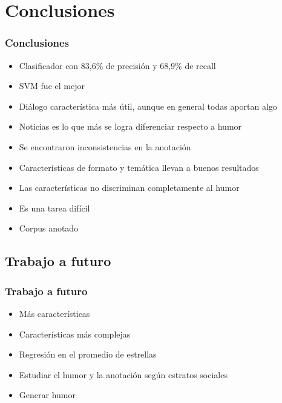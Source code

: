 \section{Conclusiones}

\begin{frame}
    \frametitle{Conclusiones}
    
    \begin{itemize}
        \item[\checkmark] Clasificador con 83,6\% de precisión y 68,9\% de recall
        \item[\checkmark] SVM fue el mejor
        \item[\checkmark] Diálogo característica más útil, aunque en general todas aportan algo
        \item[\checkmark] Noticias es lo que más se logra diferenciar respecto a humor
        \item[\checkmark] Se encontraron inconsistencias en la anotación
        \item[\checkmark] Características de formato y temática llevan a buenos resultados
        \item[\checkmark] Las características no discriminan completamente al humor
        \item[\checkmark] Es una tarea difícil
        \item[\checkmark] Corpus anotado
    \end{itemize}
\end{frame}

\subsection{Trabajo a futuro}
\begin{frame}
    \frametitle{Trabajo a futuro}
    
    \begin{itemize}
        \item Más características
        \item Características más complejas
        \item Regresión en el promedio de estrellas
        \item Estudiar el humor y la anotación según estratos sociales
        \item Generar humor
    \end{itemize}
\end{frame}

